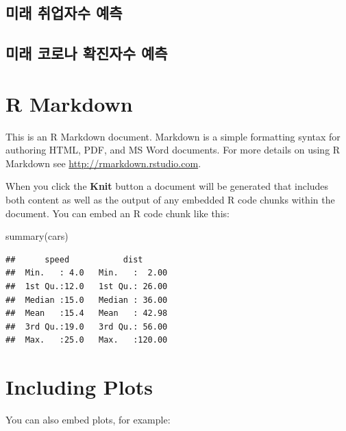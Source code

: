 \documentclass[
]{book}
\newenvironment{Shaded}{\begin{snugshade}}{\end{snugshade}}
\newcommand{\FunctionTok}[1]{\textcolor[rgb]{0.00,0.00,0.00}{#1}}
\newcommand{\NormalTok}[1]{#1}
\begin{document}
\hypertarget{uxbbf8uxb798-uxcde8uxc5c5uxc790uxc218-uxc608uxce21-1}{%
\subsection{미래 취업자수 예측}\label{uxbbf8uxb798-uxcde8uxc5c5uxc790uxc218-uxc608uxce21-1}}

\hypertarget{uxbbf8uxb798-uxcf54uxb85cuxb098-uxd655uxc9c4uxc790uxc218-uxc608uxce21-1}{%
\subsection{미래 코로나 확진자수 예측}\label{uxbbf8uxb798-uxcf54uxb85cuxb098-uxd655uxc9c4uxc790uxc218-uxc608uxce21-1}}

\hypertarget{r-markdown}{%
\section{R Markdown}\label{r-markdown}}

This is an R Markdown document. Markdown is a simple formatting syntax for authoring HTML, PDF, and MS Word documents. For more details on using R Markdown see \url{http://rmarkdown.rstudio.com}.

When you click the \textbf{Knit} button a document will be generated that includes both content as well as the output of any embedded R code chunks within the document. You can embed an R code chunk like this:

\begin{Shaded}
\begin{Highlighting}[]
\FunctionTok{summary}\NormalTok{(cars)}
\end{Highlighting}
\end{Shaded}

\begin{verbatim}
##      speed           dist       
##  Min.   : 4.0   Min.   :  2.00  
##  1st Qu.:12.0   1st Qu.: 26.00  
##  Median :15.0   Median : 36.00  
##  Mean   :15.4   Mean   : 42.98  
##  3rd Qu.:19.0   3rd Qu.: 56.00  
##  Max.   :25.0   Max.   :120.00
\end{verbatim}

\hypertarget{including-plots}{%
\section{Including Plots}\label{including-plots}}

You can also embed plots, for example:
\end{document}
